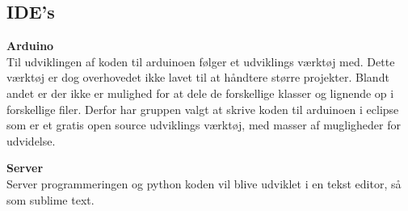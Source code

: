 \subsection*{IDE's}

\textbf{Arduino} \\
Til udviklingen af koden til arduinoen følger et udviklings værktøj med. Dette værktøj er dog overhovedet ikke lavet til at håndtere større projekter. Blandt andet er der ikke er mulighed for at dele de forskellige klasser og lignende op i forskellige filer. Derfor har gruppen valgt at skrive koden til arduinoen i eclipse som er et gratis open source udviklings værktøj, med masser af mugligheder for udvidelse.

\textbf{Server} \\
Server programmeringen og python koden vil blive udviklet i en tekst editor, så som sublime text.  